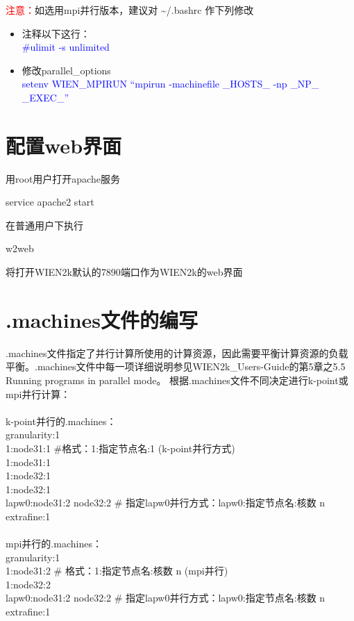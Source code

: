 \documentclass[10pt,a4paper]{article}
\newcommand{\upcite}[1]{\hspace{0ex}\textsuperscript{\cite{#1}}} %
\begin{document}
\textcolor{red}{注意：}如选用\textrm{mpi}并行版本，建议对 \~\//.bashrc 作下列修改
\begin{itemize}
	\item 注释以下这行：\\
\textcolor{blue}{\#ulimit -s unlimited}
	\item	修改parallel\_options\\
\textcolor{blue}{setenv WIEN\_MPIRUN ``mpirun -machinefile \_HOSTS\_ -np \_NP\_ \_EXEC\_''}
\end{itemize}

\section{配置web界面}
用\textrm{root}用户打开\textrm{apache}服务

service apache2 start

在普通用户下执行

\textrm{w2web}

将打开\textrm{WIEN2k}默认的\textrm{7890}端口作为\textrm{WIEN2k}的\textrm{web}界面

\section{.machines文件的编写}
\textrm{.machines}文件指定了并行计算所使用的计算资源，因此需要平衡计算资源的负载平衡。\textrm{.machines}文件中每一项详细说明参见\textrm{WIEN2k\_Users-Guide}\upcite{WIEN2K-UG_2001}的第\textrm{5}章之\textrm{5.5 Running programs in parallel mode}。
根据\textrm{.machines}文件不同决定进行\textrm{k-point}或\textrm{mpi}并行计算：\\\\
\textrm{k-point}并行的\textrm{.machines}：\\
granularity:1 \\
1:node31:1 \#格式：1:指定节点名:1 (\textrm{k-point}并行方式)\\
1:node31:1 \\
1:node32:1 \\
1:node32:1 \\
lapw0:node31:2 node32:2 \# 指定lapw0并行方式：lapw0:指定节点名:核数 n \\
extrafine:1 \\\\
\textrm{mpi}并行的\textrm{.machines}：\\
granularity:1 \\
1:node31:2 \# 格式：1:指定节点名:核数 n (\textrm{mpi}并行)\\
1:node32:2 \\
lapw0:node31:2 node32:2 \# 指定lapw0并行方式：lapw0:指定节点名:核数 n \\
extrafine:1
\end{document}
